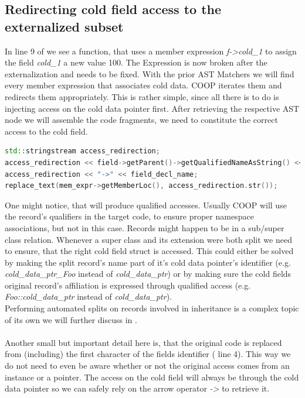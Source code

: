 \subsection{Redirecting cold field access to the externalized subset}
In line 9 of  we see a function, that uses a member expression \textit{f->cold\_1} to assign the field \textit{cold\_1} a new value 100. The Expression is now broken after the externalization and needs to be fixed. With the prior AST Matchers we will find every member expression that associates cold data. COOP iterates them and redirects them appropriately. This is rather simple, since all there is to do is injecting access on the cold data pointer first. After retrieving the respective AST node we will assemble the code fragments, we need to constitute the correct access to the cold field.\\
\begin{lstlisting}[language=C++, name={Assembling the proper access to a cold field through the additional indirection.}, label={redirect_assembly}, morekeywords={stringstream, std}]
std::stringstream access_redirection;
access_redirection << field->getParent()->getQualifiedNameAsString() << "::";
access_redirection << "->" << field_decl_name;
replace_text(mem_expr->getMemberLoc(), access_redirection.str());
\end{lstlisting}
One might notice, that  will produce qualified accesses. Usually COOP will use the record's qualifiers in the target code, to ensure proper namespace associations, but not in this case. Records might happen to be in a sub/super class relation. Whenever a super class and its extension were both split we need to ensure, that the right cold field struct is accessed. This could either be solved by making the split record's name part of it's cold data pointer's identifier (e.g. \textit{cold\_data\_ptr\_Foo} instead of \textit{cold\_data\_ptr}) or by making sure the cold fields original record's affiliation is expressed through qualified access (e.g. \textit{Foo::cold\_data\_ptr} instead of \textit{cold\_data\_ptr}).\\
Performing automated splits on records involved in inheritance is a complex topic of its own we will further discuss in .\\\\
Another small but important detail here is, that the original code is replaced from (including) the first character of the fields identifier ( line 4). This way we do not need to even be aware whether or not the original access comes from an instance or a pointer. The access on the cold field will always be through the cold data pointer so we can safely rely on the arrow operator \textit{->} to retrieve it.

